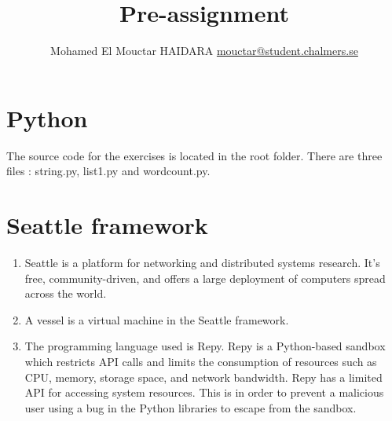 \documentclass[12pt]{article}
\begin{document}
\title{Pre-assignment}
\author{Mohamed El Mouctar HAIDARA \href{mailto:mouctar@student.chalmers.se}{mouctar@student.chalmers.se}}

\maketitle

\section{Python}
The source code for the exercises is located in the root folder. There are three files : string.py, list1.py and wordcount.py.

\section{Seattle framework}
\begin{enumerate}
\item Seattle is a platform for networking and distributed systems research. It's free, community-driven, and offers a large deployment of computers spread across the world.

\item A vessel is a virtual machine in the Seattle framework.

\item The programming language used is Repy. Repy is a Python-based sandbox which restricts API calls and limits the consumption of resources such as CPU, memory, storage space, and network bandwidth. Repy has a limited API for accessing system resources. This is in order to prevent a malicious user using a bug in the Python libraries to escape from the sandbox.


\end{enumerate}
\end{document}
